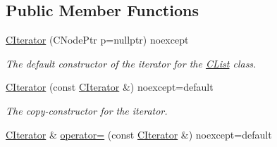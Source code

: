 \subsection*{Public Member Functions}
\begin{DoxyCompactItemize}
\item 
\hyperlink{structnsSdD_1_1CList_1_1CIterator_a121a102242fccc875b9dfaceffbe9b07}{C\+Iterator} (C\+Node\+Ptr p=nullptr) noexcept
\begin{DoxyCompactList}\small\item\em The default constructor of the iterator for the \hyperlink{classnsSdD_1_1CList}{C\+List} class. \end{DoxyCompactList}\item 
\hypertarget{structnsSdD_1_1CList_1_1CIterator_aecc67a49d5805151e8f961ff8c6f5f39}{\hyperlink{structnsSdD_1_1CList_1_1CIterator_aecc67a49d5805151e8f961ff8c6f5f39}{C\+Iterator} (const \hyperlink{structnsSdD_1_1CList_1_1CIterator}{C\+Iterator} \&) noexcept=default}\label{structnsSdD_1_1CList_1_1CIterator_aecc67a49d5805151e8f961ff8c6f5f39}

\begin{DoxyCompactList}\small\item\em The copy-\/constructor for the iterator. \end{DoxyCompactList}\item 
\hypertarget{structnsSdD_1_1CList_1_1CIterator_a222bd54da7e51ca4a6aa82ebc7264ba1}{\hyperlink{structnsSdD_1_1CList_1_1CIterator}{C\+Iterator} \& \hyperlink{structnsSdD_1_1CList_1_1CIterator_a222bd54da7e51ca4a6aa82ebc7264ba1}{operator=} (const \hyperlink{structnsSdD_1_1CList_1_1CIterator}{C\+Iterator} \&) noexcept=default}\label{structnsSdD_1_1CList_1_1CIterator_a222bd54da7e51ca4a6aa82ebc7264ba1}


\end{DoxyCompactItemize}
